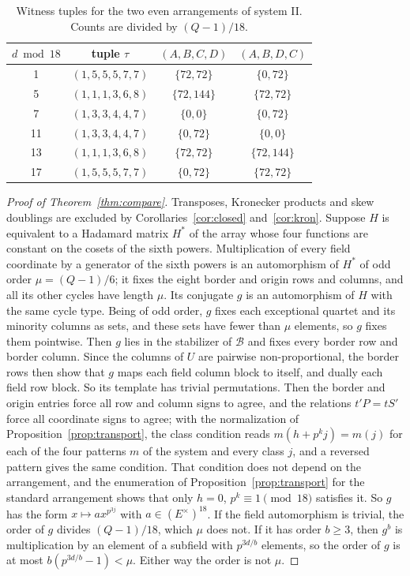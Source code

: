 \documentclass[11pt]{article}
\theoremstyle{plain}
\theoremstyle{definition}
\theoremstyle{remark}
\begin{document}
\begin{table}[ht]
\centering
\begin{tabular}{cccc}
\toprule
$d\bmod18$ & tuple $\tau$ & $(A,B,C,D)$ & $(A,B,D,C)$\\
\midrule
1  & $(1,5,5,5,7,7)$ & $\{72,72\}$ & $\{0,72\}$\\
5  & $(1,1,1,3,6,8)$ & $\{72,144\}$ & $\{72,72\}$\\
7  & $(1,3,3,4,4,7)$ & $\{0,0\}$ & $\{0,72\}$\\
11 & $(1,3,3,4,4,7)$ & $\{0,72\}$ & $\{0,0\}$\\
13 & $(1,1,1,3,6,8)$ & $\{72,72\}$ & $\{72,144\}$\\
17 & $(1,5,5,5,7,7)$ & $\{0,72\}$ & $\{72,72\}$\\
\bottomrule
\end{tabular}
\caption{Witness tuples for the two even arrangements of system II. Counts
are divided by $(Q-1)/18$.}\label{tab:hist}
\end{table}

\begin{proof}[Proof of Theorem~\ref{thm:compare}]
Transposes, Kronecker products and skew doublings are excluded by
Corollaries~\ref{cor:closed} and~\ref{cor:kron}. Suppose $H$ is equivalent
to a Hadamard matrix $H^\ast$ of the array whose four functions are constant
on the cosets of the sixth powers. Multiplication of every field coordinate
by a generator of the sixth powers is an automorphism of $H^\ast$ of odd order
$\mu=(Q-1)/6$; it fixes the eight border and origin rows and columns, and all
its other cycles have length $\mu$. Its conjugate $g$ is an automorphism of $H$
with the same cycle type. Being of odd order, $g$ fixes each exceptional
quartet and its minority columns as sets, and these sets have fewer than
$\mu$ elements, so $g$ fixes them pointwise. Then $g$ lies in the stabilizer of
$\mathcal B$ and fixes every border row and border column. Since the columns
of $U$ are pairwise non-proportional, the border rows then show that $g$
maps each field column block to itself, and dually each field row block. So
its template has trivial permutations. Then the border and origin entries
force all row and column signs to agree, and the relations $t'P=tS'$ force
all coordinate signs to agree; with the normalization of
Proposition~\ref{prop:transport}, the class condition reads $m(h+p^kj)=m(j)$
for each of the four patterns $m$ of the system and every class $j$, and a
reversed pattern gives the same condition. That condition does not depend on
the arrangement, and the enumeration of Proposition~\ref{prop:transport} for
the standard arrangement shows that only $h=0$, $p^k\equiv1\pmod{18}$
satisfies it. So $g$ has the form
$x\mapsto ax^{p^{3j}}$ with $a\in(E^\times)^{18}$. If the field automorphism is trivial, the order of $g$
divides $(Q-1)/18$, which $\mu$ does not. If it has order $b\ge3$, then $g^b$
is multiplication by an element of a subfield with $p^{3d/b}$ elements, so the
order of $g$ is at most $b(p^{3d/b}-1)<\mu$. Either way the order is not
$\mu$.
\end{proof}
\end{document}
